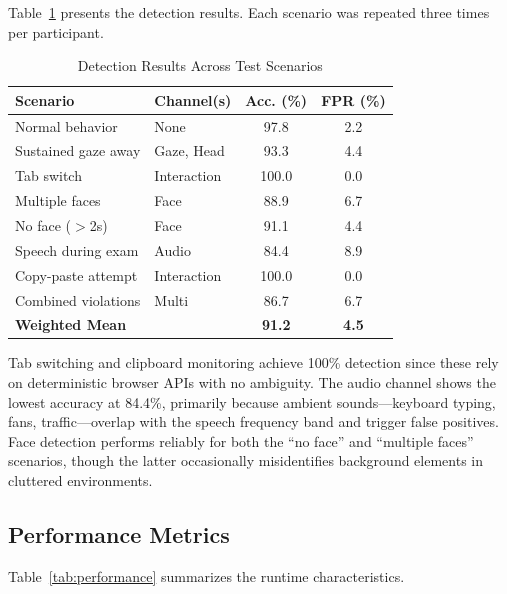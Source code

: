 \documentclass[conference]{IEEEtran}
\begin{document}
Table~\ref{tab:results} presents the detection results. Each scenario was repeated three times per participant.

\begin{table}[htbp]
\caption{Detection Results Across Test Scenarios}
\label{tab:results}
\centering
\renewcommand{\arraystretch}{1.15}
\begin{tabular}{@{}p{2.4cm}p{1.5cm}cc@{}}
\toprule
\textbf{Scenario} & \textbf{Channel(s)} & \textbf{Acc. (\%)} & \textbf{FPR (\%)} \\
\midrule
Normal behavior       & None          & 97.8 & 2.2 \\
Sustained gaze away   & Gaze, Head    & 93.3 & 4.4 \\
Tab switch            & Interaction   & 100.0 & 0.0 \\
Multiple faces        & Face          & 88.9 & 6.7 \\
No face ($>$2s)       & Face          & 91.1 & 4.4 \\
Speech during exam    & Audio         & 84.4 & 8.9 \\
Copy-paste attempt    & Interaction   & 100.0 & 0.0 \\
Combined violations   & Multi         & 86.7 & 6.7 \\
\midrule
\textbf{Weighted Mean} &              & \textbf{91.2} & \textbf{4.5} \\
\bottomrule
\end{tabular}
\end{table}

Tab switching and clipboard monitoring achieve 100\% detection since these rely on deterministic browser APIs with no ambiguity. The audio channel shows the lowest accuracy at 84.4\%, primarily because ambient sounds---keyboard typing, fans, traffic---overlap with the speech frequency band and trigger false positives. Face detection performs reliably for both the ``no face'' and ``multiple faces'' scenarios, though the latter occasionally misidentifies background elements in cluttered environments.

\subsection{Performance Metrics}

Table~\ref{tab:performance} summarizes the runtime characteristics.
\end{document}
